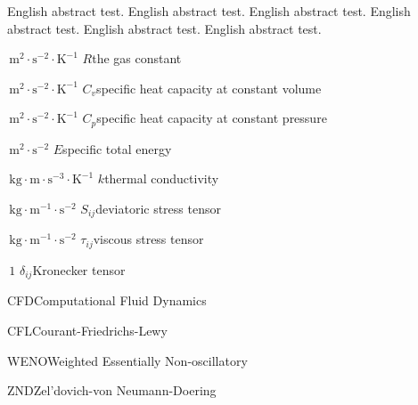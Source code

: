 \documentclass[
  fontset = mac,
]{shtthesis}
\providecommand{\Unit}[1]{\,\mathrm{#1}}
\begin{document}
\maketitle

\frontmatter
\begin{abstract}
  考虑到许多同学可能缺乏\LaTeX{}使用经验，\shtthesis 将\LaTeX{}的复杂性高度封装，开放出简单的接口，以便轻易使用。同时，对用\LaTeX{}撰写论文的一些主要难题，如制图、制表、文献索引等，进行了详细说明，并提供了相应的代码样本，理解了上述问题后，对于初学者而言，使用此模板撰写学位论文将不存在实质性的困难。所以，如果你是初学者，请不要直接放弃，因为同样为初学者的我，十分明白让\LaTeX{}简单易用的重要性，而这正是\shtthesis 所追求和体现的。
\end{abstract}

\begin{abstract*}
  English abstract test. English abstract test. English abstract test. English abstract test. English abstract test. English abstract test. 
\end{abstract*}

\makeindices

\begin{nomenclatures}
  \item[$\Unit{m^{2} \cdot s^{-2} \cdot K^{-1}}$]{$R$}{the gas constant}
  \item[$\Unit{m^{2} \cdot s^{-2} \cdot K^{-1}}$]{$C_v$}{specific heat capacity at constant volume}
  \item[$\Unit{m^{2} \cdot s^{-2} \cdot K^{-1}}$]{$C_p$}{specific heat capacity at constant pressure}
  \item[$\Unit{m^{2} \cdot s^{-2}}$]{$E$}{specific total energy}
  \item[$\Unit{kg \cdot m \cdot s^{-3} \cdot K^{-1}}$]{$k$}{thermal conductivity}
  \item[$\Unit{kg \cdot m^{-1} \cdot s^{-2}}$]{$S_{ij}$}{deviatoric stress tensor}
  \item[$\Unit{kg \cdot m^{-1} \cdot s^{-2}}$]{$\tau_{ij}$}{viscous stress tensor}
  \item[$\Unit{1}$]{$\delta_{ij}$}{Kronecker tensor}
\end{nomenclatures}

\begin{nomenclatures}[缩写]
  \item{CFD}{Computational Fluid Dynamics}
  \item{CFL}{Courant-Friedrichs-Lewy}
  \item{WENO}{Weighted Essentially Non-oscillatory}
  \item{ZND}{Zel'dovich-von Neumann-Doering}
\end{nomenclatures}
\end{document}
